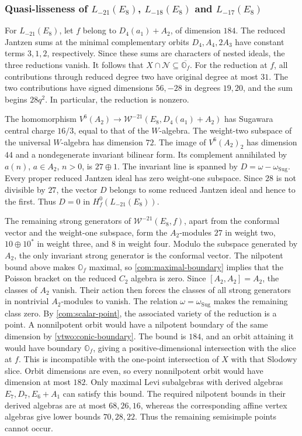 \documentclass[11pt,a4paper]{amsart}
\numberwithin{equation}{section}
\theoremstyle{definition}
\theoremstyle{remark}
\newcommand{\N}{\mathcal N}
\newcommand{\OO}{\mathbb O}
\begin{document}
\subsubsection{\texorpdfstring{Quasi-lisseness of $L_{-21}(E_8)$, $L_{-18}(E_8)$ and $L_{-17}(E_8)$}{Quasi-lisseness of L-21(E8), L-18(E8) and L-17(E8)}}
\label{exc:e8-remaining}
For $L_{-21}(E_8)$, let $f$ belong to $D_4(a_1)+A_2$, of dimension $184$.
The reduced Jantzen sums at the minimal complementary orbits
$D_4,A_4,2A_3$ have constant terms $3,1,2$, respectively. Since these
sums are characters of nested ideals, the three reductions vanish.
It follows that $X\cap\N\subseteq\overline{\OO_f}$.
For the reduction at $f$, all contributions through reduced degree
two have original degree at most $31$. The two contributions have
signed dimensions $56,-28$ in degrees $19,20$, and the sum begins
$28q^2$. In particular, the reduction is nonzero.

The homomorphism
$V^6(A_2)\to\mathcal W^{-21}(E_8,D_4(a_1)+A_2)$ has Sugawara
central charge $16/3$, equal to that of the $W$-algebra. The
weight-two subspace of the universal $W$-algebra has dimension $72$.
The image of $V^6(A_2)_2$ has dimension $44$ and a nondegenerate
invariant bilinear form. Its complement annihilated by $a(n)$,
$a\in A_2$, $n>0$, is $27\oplus1$. The invariant line is spanned by
$D=\omega-\omega_{\mathrm{Sug}}$. Every proper reduced Jantzen ideal
has zero weight-one subspace. Since $28$ is not divisible by $27$,
the vector $D$ belongs to some reduced Jantzen ideal and hence to the
first. Thus $D=0$ in $H_f^0(L_{-21}(E_8))$.

The remaining strong generators of $\mathcal W^{-21}(E_8,f)$,
apart from the conformal vector and the weight-one subspace,
form the $A_2$-modules $27$ in
weight two, $10\oplus10^*$ in weight three, and $8$ in weight four.
Modulo the subspace generated by $A_2$, the only invariant strong
generator is the conformal vector. The nilpotent bound above makes
$\OO_f$ maximal, so \cref{com:maximal-boundary} implies that the
Poisson bracket on the reduced $C_2$ algebra is zero. Since
$[A_2,A_2]=A_2$, the classes of $A_2$ vanish. Their action then forces
the classes of all strong generators in nontrivial $A_2$-modules to
vanish. The relation $\omega=\omega_{\mathrm{Sug}}$ makes the remaining
class zero. By \cref{com:scalar-point}, the associated variety of the reduction is a point.
A nonnilpotent orbit would have a nilpotent boundary of the same
dimension by \cref{vtwo:conic-boundary}. The bound is $184$, and an
orbit attaining it would have boundary $\OO_f$, giving a
positive-dimensional intersection with the slice at $f$. This is incompatible
with the one-point intersection of $X$ with that Slodowy slice.
Orbit dimensions are even, so every
nonnilpotent orbit would have dimension at most $182$. Only
maximal Levi subalgebras with derived algebras $E_7,D_7,E_6+A_1$ can
satisfy this bound. The required nilpotent bounds in their derived
algebras are at most $68,26,16$, whereas the corresponding affine
vertex algebras give lower bounds $70,28,22$. Thus the
remaining semisimple points cannot occur.
\end{document}
